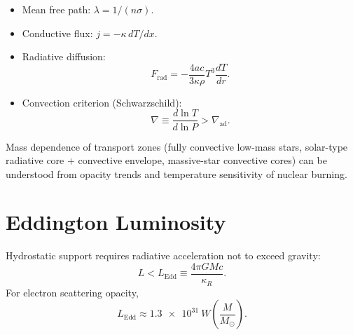 \begin{theory}
\begin{itemize}
    \item Mean free path: $\lambda=1/(n\sigma)$.
    \item Conductive flux: $j=-\kappa\,dT/dx$.
    \item Radiative diffusion:
    \begin{equation}
        F_{\text{rad}} = -\frac{4ac}{3\kappa\rho}T^3\frac{dT}{dr}.
    \end{equation}
    \item Convection criterion (Schwarzschild):
    \begin{equation}
        \nabla \equiv \frac{d\ln T}{d\ln P} > \nabla_{\text{ad}}.
    \end{equation}
\end{itemize}
\end{theory}

\begin{extra}
Mass dependence of transport zones (fully convective low-mass stars, solar-type radiative core + convective envelope, massive-star convective cores) can be understood from opacity trends and temperature sensitivity of nuclear burning.
\end{extra}

\section{Eddington Luminosity}
\begin{theory}
Hydrostatic support requires radiative acceleration not to exceed gravity:
\begin{equation}
    L < L_{\text{Edd}}\equiv\frac{4\pi GMc}{\kappa_R}.
\end{equation}
For electron scattering opacity,
\begin{equation}
    L_{\text{Edd}}\approx \SI{1.3e31}{W}\left(\frac{M}{M_\odot}\right).
\end{equation}
\end{theory}
